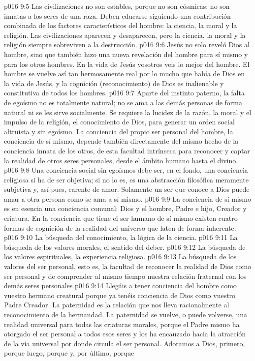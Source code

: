 \vs p016 9:5 Las civilizaciones no son estables, porque no son cósmicas; no son innatas a los seres de una raza. Deben educarse siguiendo una contribución combinada de los factores característicos del hombre: la ciencia, la moral y la religión. Las civilizaciones aparecen y desaparecen, pero la ciencia, la moral y la religión siempre sobreviven a la destrucción.
\vs p016 9:6 Jesús no solo reveló Dios al hombre, sino que también hizo una nueva revelación del hombre para sí mismo y para los otros hombres. En la vida de Jesús vosotros veis lo mejor del hombre. El hombre se vuelve así tan hermosamente real por lo mucho que había de Dios en la vida de Jesús, y la cognición (reconocimiento) de Dios es inalienable y constitutiva de todos los hombres.
\vs p016 9:7 \pc Aparte del instinto paterno, la falta de egoísmo no es totalmente natural; no se ama a las demás personas de forma natural ni se les sirve socialmente. Se requiere la lucidez de la razón, la moral y el impulso de la religión, el conocimiento de Dios, para generar un orden social altruista y sin egoísmo. La conciencia del propio ser personal del hombre, la conciencia de sí mismo, depende también directamente del mismo hecho de la conciencia innata de los otros, de esta facultad intrínseca para reconocer y captar la realidad de otros seres personales, desde el ámbito humano hasta el divino.
\vs p016 9:8 Una conciencia social sin egoísmos debe ser, en el fondo, una conciencia religiosa si ha de ser objetiva; si no lo es, es una abstracción filosófica meramente subjetiva y, así pues, carente de amor. Solamente un ser que conoce a Dios puede amar a otra persona como se ama a sí mismo.
\vs p016 9:9 La conciencia de sí mismo es en esencia una conciencia comunal: Dios y el hombre, Padre e hijo, Creador y criatura. En la conciencia que tiene el ser humano de sí mismo existen cuatro formas de cognición de la realidad del universo que laten de forma inherente:
\vs p016 9:10 La búsqueda del conocimiento, la lógica de la ciencia.
\vs p016 9:11 La búsqueda de los valores morales, el sentido del deber.
\vs p016 9:12 La búsqueda de los valores espirituales, la experiencia religiosa.
\vs p016 9:13 La búsqueda de los valores del ser personal, esto es, la facultad de reconocer la realidad de Dios como ser personal y de comprender al mismo tiempo nuestra relación fraternal con los demás seres personales
\vs p016 9:14 \pc Llegáis a tener conciencia del hombre como vuestro hermano creatural porque ya tenéis conciencia de Dios como vuestro Padre Creador. La paternidad es la relación que nos lleva racionalmente al reconocimiento de la hermandad. La paternidad se vuelve, o puede volverse, una realidad universal para todas las criaturas morales, porque el Padre mismo ha otorgado el ser personal a todos esos seres y los ha encauzado hacia la atracción de la vía universal por donde circula el ser personal. Adoramos a Dios, primero, porque  luego, porque  y, por último, porque 
